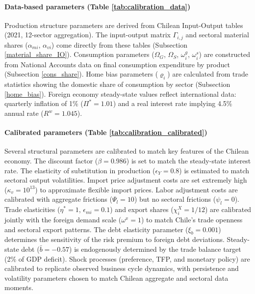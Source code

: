 \paragraph{Data-based parameters (Table \ref{tab:calibration_data})} 
Production structure parameters are derived from Chilean Input-Output tables (2021, 12-sector aggregation). The input-output matrix $\Gamma_{i,j}$ and sectoral material shares ($\alpha_{mi}$, $\alpha_{vi}$) come directly from these tables (Subsection \ref{material_share_IO}). Consumption parameters ($\Omega_G$, $\Omega_S$, $\omega_i^g$, $\omega_i^s$) are constructed from National Accounts data on final consumption expenditure by product (Subsection \ref{cons_share}). Home bias parameters ($\varrho_i$) are calculated from trade statistics showing the domestic share of consumption by sector (Subsection \ref{home_bias}). Foreign economy steady-state values reflect international data: quarterly inflation of 1\% ($\Pi^*=1.01$) and a real interest rate implying 4.5\% annual rate ($R^w=1.045$).

\paragraph{Calibrated parameters (Table \ref{tab:calibration_calibrated})} 
Several structural parameters are calibrated to match key features of the Chilean economy. The discount factor ($\beta=0.986$) is set to match the steady-state interest rate. The elasticity of substitution in production ($\epsilon_Y=0.8$) is estimated to match sectoral output volatilities. Import price adjustment costs are set extremely high ($\kappa_v=10^{13}$) to approximate flexible import prices. Labor adjustment costs are calibrated with aggregate frictions ($\Psi_l=10$) but no sectoral frictions ($\psi_l=0$). Trade elasticities ($\eta^*=1$, $\epsilon_{mi}=0.1$) and export shares ($\chi_i^X=1/12$) are calibrated jointly with the foreign demand scale ($\omega^x=1$) to match Chile's trade openness and sectoral export patterns. The debt elasticity parameter ($\xi_b=0.001$) determines the sensitivity of the risk premium to foreign debt deviations. Steady-state debt ($\bar{b}=-0.57$) is endogenously determined by the trade balance target (2\% of GDP deficit). Shock processes (preference, TFP, and monetary policy) are calibrated to replicate observed business cycle dynamics, with persistence and volatility parameters chosen to match Chilean aggregate and sectoral data moments.
